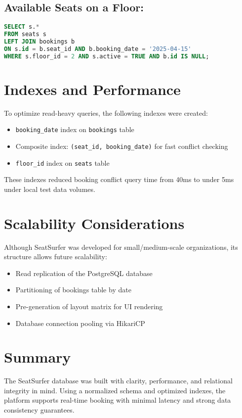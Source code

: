 \documentclass[12pt,a4paper]{report}
\begin{document}
\subsection*{Available Seats on a Floor:}

\begin{lstlisting}[language=SQL]
SELECT s.*
FROM seats s
LEFT JOIN bookings b
ON s.id = b.seat_id AND b.booking_date = '2025-04-15'
WHERE s.floor_id = 2 AND s.active = TRUE AND b.id IS NULL;
\end{lstlisting}

\section{Indexes and Performance}

To optimize read-heavy queries, the following indexes were created:
\begin{itemize}
    \item \verb|booking_date| index on \verb|bookings| table
    \item Composite index: \verb|(seat_id, booking_date)| for fast conflict checking
    \item \verb|floor_id| index on \verb|seats| table
\end{itemize}

These indexes reduced booking conflict query time from 40ms to under 5ms under local test data volumes.

\section{Scalability Considerations}

Although SeatSurfer was developed for small/medium-scale organizations, its structure allows future scalability:
\begin{itemize}
    \item Read replication of the PostgreSQL database
    \item Partitioning of bookings table by date
    \item Pre-generation of layout matrix for UI rendering
    \item Database connection pooling via HikariCP
\end{itemize}

\section{Summary}

The SeatSurfer database was built with clarity, performance, and relational integrity in mind. Using a normalized schema and optimized indexes, the platform supports real-time booking with minimal latency and strong data consistency guarantees.
\end{document}
